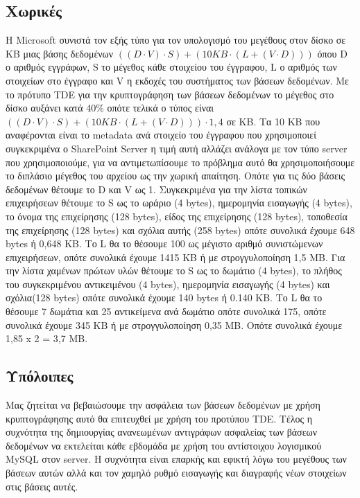 \subsection{Χωρικές}
Η Microsoft συνιστά τον εξής τύπο για τον υπολογισμό του μεγέθους στον δίσκο σε KB μιας βάσης
δεδομένων $((D \cdot V) \cdot  S) + (10 KB \cdot  (L + (V \cdot  D)))$ όπου D ο αριθμός εγγράφων, S το 
μέγεθος κάθε στοιχείου του έγγραφου, L ο αριθμός των στοιχείων στο έγγραφο και V η εκδοχές του 
συστήματος των βάσεων δεδομένων.  Με το πρότυπο TDE για την κρυπτογράφηση των βάσεων 
δεδομένων το μέγεθος  στο δίσκο αυξάνει κατά 40\% οπότε τελικά ο τύπος είναι 
$((D \cdot  V) \cdot  S) + (10 KB \cdot  (L + (V \cdot  D))) \cdot 1,4$ σε KB. Τα 10 KB που αναφέρονται 
είναι το metadata ανά στοιχείο του έγγραφου που χρησιμοποιεί συγκεκριμένα ο SharePoint Server 
η τιμή αυτή αλλάζει ανάλογα με τον τύπο server που χρησιμοποιούμε, για να αντιμετωπίσουμε το 
πρόβλημα αυτό θα χρησιμοποιήσουμε το διπλάσιο μέγεθος του αρχείου ως την χωρική απαίτηση. 
Οπότε για τις δύο βάσεις δεδομένων θέτουμε το D και V ως 1. Συγκεκριμένα για την λίστα τοπικών 
επιχειρήσεων θέτουμε το S ως το ωράριο (4 bytes), ημερομηνία εισαγωγής (4 bytes), το όνομα της 
επιχείρησης (128 bytes), είδος της επιχείρησης (128 bytes), τοποθεσία της επιχείρησης  (128 bytes) 
και σχόλια αυτής (258 bytes) οπότε συνολικά έχουμε 648 bytes ή 0,648 KB.  Το L θα το θέσουμε 100 
ως μέγιστο αριθμό συνιστώμενων επιχειρήσεων, οπότε συνολικά έχουμε 1415 ΚΒ ή με 
στρογγυλοποίηση 1,5 MB. Για την λίστα χαμένων πρώτων υλών θέτουμε το S ως το δωμάτιο (4 bytes), 
το πλήθος του συγκεκριμένου αντικειμένου (4 bytes), ημερομηνία εισαγωγής (4 bytes) και σχόλια(128 bytes) 
οπότε συνολικά έχουμε 140  bytes ή 0.140 KB. Το L θα το θέσουμε 7 δωμάτια και 25 αντικείμενα ανά δωμάτιο 
οπότε συνολικά 175, οπότε συνολικά έχουμε 345 ΚΒ ή με στρογγυλοποίηση 0,35 MB. Οπότε συνολικά έχουμε 
1,85 x 2 = 3,7 ΜΒ.

\subsection{Υπόλοιπες}
Μας ζητείται να βεβαιώσουμε την ασφάλεια των βάσεων δεδομένων με χρήση κρυπτογράφησης αυτό θα 
επιτευχθεί με χρήση του προτύπου TDE. Τέλος η συχνότητα της δημιουργίας ανανεωμένων αντιγράφων 
ασφαλείας των βάσεων δεδομένων να εκτελείται κάθε εβδομάδα με χρήση του αντίστοιχου λογισμικού 
MySQL στον server. H συχνότητα είναι επαρκής και εφικτή λόγω του μεγέθους των βάσεων αυτών αλλά 
και τον χαμηλό ρυθμό εισαγωγής και διαγραφής νέων στοιχείων στις βάσεις αυτές. 
